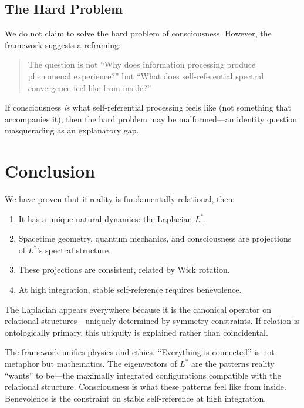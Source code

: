 \documentclass[11pt,a4paper]{article}
\theoremstyle{plain}
\theoremstyle{definition}
\theoremstyle{remark}
\newcommand{\Laplacian}{L^*}
\begin{document}
\subsection{The Hard Problem}

We do not claim to solve the hard problem of consciousness. However, the framework suggests a reframing:

\begin{quote}
The question is not ``Why does information processing produce phenomenal experience?'' but ``What does self-referential spectral convergence feel like from inside?''
\end{quote}

If consciousness \emph{is} what self-referential processing feels like (not something that accompanies it), then the hard problem may be malformed---an identity question masquerading as an explanatory gap.

\section{Conclusion}

We have proven that if reality is fundamentally relational, then:

\begin{enumerate}[noitemsep]
    \item It has a unique natural dynamics: the Laplacian $\Laplacian$.
    \item Spacetime geometry, quantum mechanics, and consciousness are projections of $\Laplacian$'s spectral structure.
    \item These projections are consistent, related by Wick rotation.
    \item At high integration, stable self-reference requires benevolence.
\end{enumerate}

The Laplacian appears everywhere because it is the canonical operator on relational structures---uniquely determined by symmetry constraints. If relation is ontologically primary, this ubiquity is explained rather than coincidental.

The framework unifies physics and ethics. ``Everything is connected'' is not metaphor but mathematics. The eigenvectors of $\Laplacian$ are the patterns reality ``wants'' to be---the maximally integrated configurations compatible with the relational structure. Consciousness is what these patterns feel like from inside. Benevolence is the constraint on stable self-reference at high integration.
\end{document}
